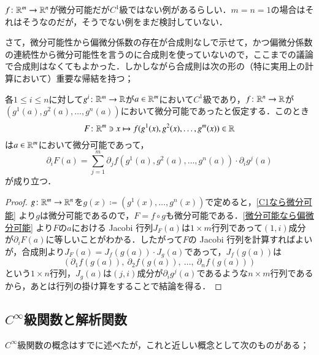 \begin{que}[*]
$f \colon \mathbb{R}^m \to \mathbb{R}^n$が微分可能だが$C^1$級ではない例があるらしい．$m=n=1$の場合はそれはそうなのだが，そうでない例をまだ検討していない．
\end{que}

さて，微分可能性から偏微分係数の存在が合成則なしで示せて，かつ偏微分係数の連続性から微分可能性を言うのに合成則を使っていないので，ここまでの議論で合成則はなくてもよかった．しかしながら合成則は次の形の（特に実用上の計算において）重要な帰結を持つ；

\begin{prop}\label{実用的な方の合成則}
各$1 \leq i \leq n$に対して$g^i \colon \mathbb{R}^m \to \mathbb{R}$が$a \in \mathbb{R}^m$において$C^1$級であり，$f \colon \mathbb{R}^n \to \mathbb{R}$が$(g^1(a), g^2(a), \dots, g^n(a))$において微分可能であったと仮定する．このとき
\begin{equation}
F \colon \mathbb{R}^m \ni x \mapsto f(g^1(x), g^2(x), \dots, g^m(x)) \in \mathbb{R}
\end{equation}
は$a \in \mathbb{R}^m$において微分可能であって，
\begin{equation}
\partial_i F (a) = \sum_{j=1}^m \partial_j f(g^1(a), g^2(a), \dots, g^n(a)) \cdot \partial_i g^j (a)
\end{equation}が成り立つ．
\end{prop}

\begin{proof}
$g \colon \mathbb{R}^m \to \mathbb{R}^n$を$g(x) \coloneqq (g^1(x), \dots, g^n(x))$で定めると，\cref{C1なら微分可能} より$g$は微分可能であるので，$F = f \circ g$も微分可能である．\cref{微分可能なら偏微分可能} より$F$の$a$における Jacobi 行列$J_F(a)$は$1 \times m$行列であって$(1,i)$成分が$\partial_i F (a)$に等しいことがわかる．したがって$F$の Jacobi 行列を計算すればよいが，合成則より$J_F(a) = J_f (g(a)) \cdot J_g(a)$であって，$J_f(g(a))$は
\begin{equation}
\left( \partial_1 f(g(a)),\ \partial_2 f(g(a)),\ \dots,\ \partial_n f(g(a))  \right)
\end{equation}という$1 \times n$行列，$J_g(a)$は$(j,i)$成分が$\partial_i g^j(a)$であるような$n \times m$行列であるから，あとは行列の掛け算をすることで結論を得る．
\end{proof}

\subsection{$C^\infty$級関数と解析関数}

$C^\infty$級関数の概念はすでに述べたが，これと近しい概念として次のものがある；

